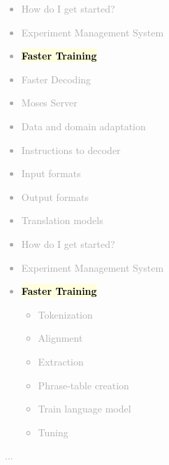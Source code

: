 \documentclass[landscape]{uedslides2C}
\newcommand{\currenttopic}[1]{\colorbox{lightyellow}{\textcolor{black}{\bf #1}}}
\begin{document}

\vspace{-5mm}
\textcolor{darkgrey}{
\begin{itemize} \itemsep -1mm
\item {How do I get started?}
\item {Experiment Management System}
\item \currenttopic{Faster Training}
\item {Faster Decoding}
\item {Moses Server}
\item {Data and domain adaptation}
\item {Instructions to decoder}
\item {Input formats}
\item {Output formats}
\item {Translation models}
\end{itemize}
}


\vspace{-5mm}
\textcolor{darkgrey}{
\begin{itemize} \itemsep -1mm
\item {How do I get started?}
\item {Experiment Management System}
\item \currenttopic{Faster Training}
  \begin{itemize}
  \item Tokenization
  \item Alignment
  \item Extraction
  \item Phrase-table creation
  \item Train language model
  \item Tuning
  \end{itemize}
\end{itemize}
...
}


\end{document}
